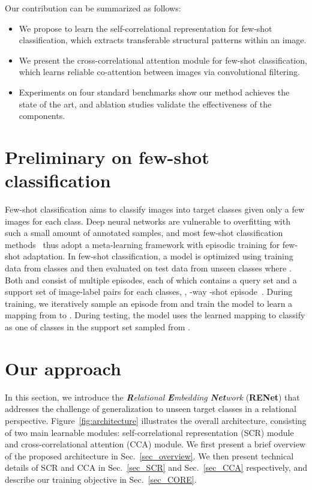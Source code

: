\documentclass[10pt,twocolumn,letterpaper]{article}
\newcommand{\ours}{RENet\xspace}
\newcommand{\abbself}{SCR\xspace}
\newcommand{\abbcross}{CCA\xspace}
\begin{document}
Our contribution can be summarized as follows:
\begin{itemize}
    \item We propose to learn the self-correlational representation for few-shot classification, which extracts transferable structural patterns within an image.
    \item We present the cross-correlational attention module for few-shot classification, which learns reliable co-attention between images via convolutional filtering.    
    \item Experiments on four standard benchmarks show our method achieves the state of the art, and ablation studies validate the effectiveness of the components.
\end{itemize}
 \section{Preliminary on few-shot classification}
Few-shot classification aims to classify images into target classes given only a few images for each class. 
Deep neural networks are vulnerable to overfitting with such a small amount of annotated samples, and most few-shot classification methods~\cite{matchingnet, ravi2016optimization, protonet} thus adopt a meta-learning framework with episodic training for few-shot adaptation. 
In few-shot classification, a model is optimized using training data  from classes  and then evaluated on test data  from unseen classes  where .
Both  and  consist of multiple episodes, each of which contains a query set  and a support set  of  image-label pairs for each  classes, \ie, -way -shot episode~\cite{fei2006one, matchingnet}.
During training, we iteratively sample an episode from  and train the model to learn a mapping from  to .
During testing, the model uses the learned mapping to classify  as one of  classes in the support set  sampled from . \section {Our approach}
In this section, we introduce the \textit{\textbf{R}elational \textbf{E}mbedding \textbf{Net}work} (\textbf{\ours}) that addresses the challenge of generalization to unseen target classes in a relational perspective.
Figure~\ref{fig:architecture} illustrates the overall architecture, consisting of two main learnable modules: self-correlational representation (\abbself) module and cross-correlational attention (\abbcross) module.
We first present a brief overview of the proposed architecture in Sec.~\ref{sec_overview}.
We then present technical details of \abbself and \abbcross in Sec.~\ref{sec_SCR} and Sec.~\ref{sec_CCA} respectively, and describe our training objective in Sec.~\ref{sec_CORE}.
\end{document}
